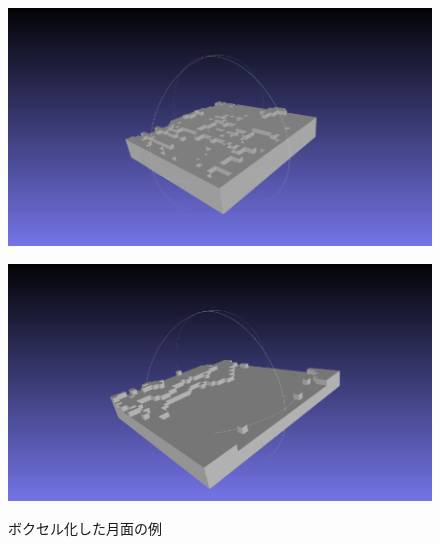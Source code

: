 \documentclass[uplatex,twocolumn, dvipdfmx]{jsarticle}  %
\begin{document}
\begin{figure}[t]
  \centering
  \begin{minipage}[b]{0.49\linewidth}
    \centering
    \includegraphics[keepaspectratio, scale=0.25]{images/voxel1.png}
    \label{fig:voxel1}
  \end{minipage}
  \begin{minipage}[b]{0.49\linewidth}
    \centering
    \includegraphics[keepaspectratio, scale=0.25]{images/voxel2.png}
    \label{fig:voxel2}
  \end{minipage}
  \caption{ボクセル化した月面の例}\label{fig:voxel_moons}
\end{figure}
\end{document}
